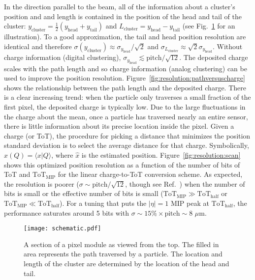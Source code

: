 \documentclass[12pt]{article}
\begin{document}
In the direction parallel to the beam, all of the information about a cluster's position and and length is contained in the position of the head and tail of the cluster: $y_\text{cluster}=\frac{1}{2}(y_\text{head}+y_\text{tail})$ and $L_\text{cluster}=y_\text{head}-y_\text{tail}$ (see Fig.~\ref{fig:resolution:schematic} for an illustration).  To a good approximation, the tail and head position resolution are identical and therefore $\sigma(y_\text{cluster})\approx\sigma_{y_\text{head}}/\sqrt{2}$ and $\sigma_{L_\text{cluster}}\approx\sqrt{2}\sigma_{y_\text{head}}$.  Without charge information (digital clustering), $\sigma_{y_\text{head}}\lesssim\text{pitch}/\sqrt{12}$.  The deposited charge scales with the path length and so charge information (analog clustering) can be used to improve the position resolution.  Figure~\ref{fig:resolution:pathversuscharge} shows the relationship between the path length and the deposited charge.  There is a clear increasing trend: when the particle only traverses a small fraction of the first pixel, the deposited charge is typically low.  Due to the large fluctuations in the charge about the mean, once a particle has traversed nearly an entire sensor, there is little information about its precise location inside the pixel.  Given a charge (or ToT), the procedure for picking a distance that minimizes the position standard deviation is to select the average distance for that charge.  Symbolically, $\hat{x}(Q) = \langle x|Q\rangle$, where $\hat{x}$ is the estimated position.  Figure~\ref{fig:resolution:scan} shows this optimized position resolution as a function of the number of bits of ToT and $\text{ToT}_\text{MIP}$ for the linear charge-to-ToT conversion scheme.  As expected, the resolution is poorer ($\sigma\sim\text{pitch}/\sqrt{12}$, though see Ref.~\cite{binaryreadout}) when the number of bits is small or the effective number of bits is small ($\text{ToT}_\text{MIP}\gg\text{ToT}_\text{half}$ or $\text{ToT}_\text{MIP}\ll\text{ToT}_\text{half}$).  For a tuning that puts the $|\eta|=1$ MIP peak at $\text{ToT}_\text{half}$, the performance saturates around 5 bits with $\sigma\sim 15\%\times\text{pitch}\sim8$ $\mu$m.

\begin{figure}[h!]
\centering
\texttt{[image: schematic.pdf]}
\caption{A section of a pixel module as viewed from the top.  The filled in area represents the path traversed by a particle.  The location and length of the cluster are determined by the location of the head and tail.}
\label{fig:resolution:schematic}
\end{figure}
\end{document}
